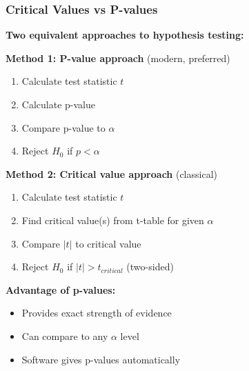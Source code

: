 \documentclass{beamer}
\begin{document}
\begin{frame}
\frametitle{Critical Values vs P-values}
\textbf{Two equivalent approaches to hypothesis testing:}

\vspace{0.2cm}
\textbf{Method 1: P-value approach} (modern, preferred)
\begin{enumerate}
\item Calculate test statistic $t$
\item Calculate p-value
\item Compare p-value to $\alpha$
\item Reject $H_0$ if $p < \alpha$
\end{enumerate}

\vspace{0.2cm}
\textbf{Method 2: Critical value approach} (classical)
\begin{enumerate}
\item Calculate test statistic $t$
\item Find critical value(s) from t-table for given $\alpha$
\item Compare $|t|$ to critical value
\item Reject $H_0$ if $|t| > t_{critical}$ (two-sided)
\end{enumerate}

\vspace{0.2cm}
\textbf{Advantage of p-values:}
\begin{itemize}
\item Provides exact strength of evidence
\item Can compare to any $\alpha$ level
\item Software gives p-values automatically
\end{itemize}
\end{frame}
\end{document}
